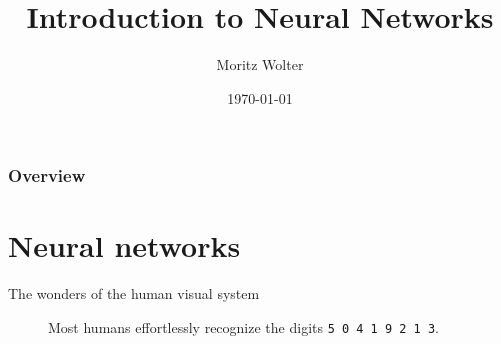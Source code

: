 \documentclass{beamer}
\title{Introduction to Neural Networks}
\date{\today}
\institute{High-Performance Computing and Analytics Lab}
\author{Moritz Wolter}
\begin{document}
    \maketitle

    \begin{frame}
    \frametitle{Overview} 
    \tableofcontents
    \end{frame}

    \section{Neural networks}
    \begin{frame}{The wonders of the human visual system}
      \begin{figure}
        
        \caption{Most humans effortlessly recognize the digits \texttt{5 0 4 1 9 2 1 3}.}
      \end{figure}
    \end{frame}
\end{document}
